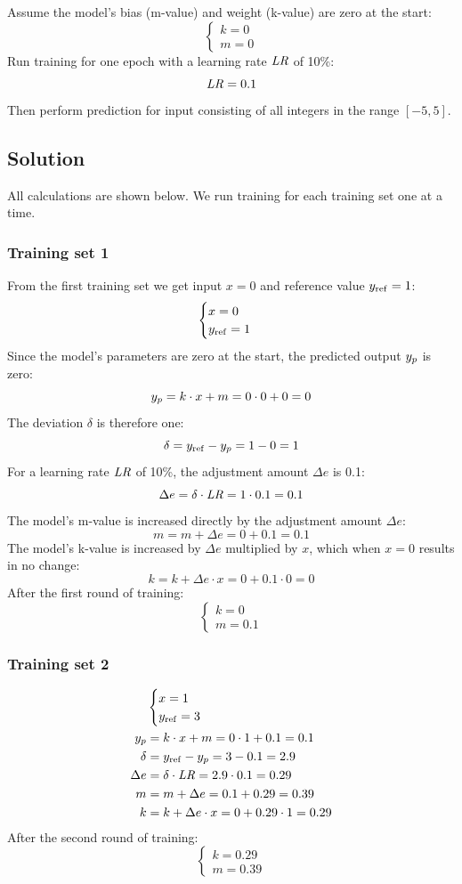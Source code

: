 Assume the model's bias (m-value) and weight (k-value) are zero at the start:
\[
  \begin{cases} k = 0 \\ m = 0 \end{cases}
\]
Run training for one epoch with a learning rate $\mathit{LR}$ of 10\%:
\[
  \mathit{LR} = 0.1
\]
Then perform prediction for input consisting of all integers in the range $[-5, 5]$.

\subsection{Solution}
All calculations are shown below. We run training for each training set one at a time.

\subsubsection{Training set 1}
From the first training set we get input $x = 0$ and reference value $y_{\mathrm{ref}} = 1$:
\[
  \begin{cases} x = 0 \\ y_{\mathrm{ref}} = 1 \end{cases}
\]
Since the model's parameters are zero at the start, the predicted output $y_{p}$ is zero:
\[
  y_{p} = k \cdot x + m = 0 \cdot 0 + 0 = 0
\]
The deviation $\delta$ is therefore one:
\[
  \delta = y_{\mathrm{ref}} - y_{p} = 1 - 0 = 1
\]
For a learning rate $\mathit{LR}$ of 10\%, the adjustment amount $\Delta e$ is 0.1:
\[
  \Delta e = \delta \cdot \mathit{LR} = 1 \cdot 0.1 = 0.1
\]
The model's m-value is increased directly by the adjustment amount $\Delta e$:
\[
  m = m + \Delta e = 0 + 0.1 = 0.1
\]
The model's k-value is increased by $\Delta e$ multiplied by $x$, which when $x = 0$ results in no
change:
\[
  k = k + \Delta e \cdot x = 0 + 0.1 \cdot 0 = 0
\]
After the first round of training:
\[
  \begin{cases} k = 0 \\ m = 0.1 \end{cases}
\]

\subsubsection{Training set 2}
\begin{align*}
  &\begin{cases} x = 1 \\ y_{\mathrm{ref}} = 3 \end{cases} \\
  y_{p} &= k \cdot x + m = 0 \cdot 1 + 0.1 = 0.1 \\
  \delta &= y_{\mathrm{ref}} - y_{p} = 3 - 0.1 = 2.9 \\
  \Delta e &= \delta \cdot \mathit{LR} = 2.9 \cdot 0.1 = 0.29 \\
  m &= m + \Delta e = 0.1 + 0.29 = 0.39 \\
  k &= k + \Delta e \cdot x = 0 + 0.29 \cdot 1 = 0.29
\end{align*}
After the second round of training:
\[
  \begin{cases} k = 0.29 \\ m = 0.39 \end{cases}
\]


